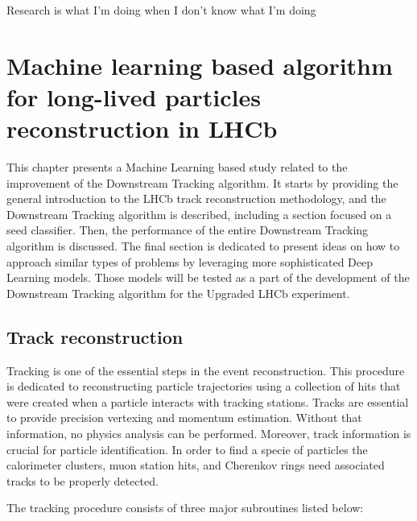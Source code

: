 \begin{savequote}[75mm] 
Research is what I’m doing when I don’t know what I’m doing
\end{savequote}

\chapter{Machine learning based algorithm for long-lived particles reconstruction in LHCb}
\label{chapter:PLLT}

This chapter presents a Machine Learning based study related to the improvement of the Downstream Tracking algorithm. It starts by providing the general introduction to the LHCb track reconstruction methodology, and the Downstream Tracking algorithm is described, including a section focused on a seed classifier. Then, the performance of the entire Downstream Tracking algorithm is discussed. The final section is dedicated to present ideas on how to approach similar types of problems by leveraging more sophisticated Deep Learning models. Those models will be tested as a part of the development of the Downstream Tracking algorithm for the Upgraded LHCb experiment.   

\section{Track reconstruction}
Tracking is one of the essential steps in the event reconstruction. This procedure is dedicated to reconstructing particle trajectories using a collection of hits that were created when a particle interacts with tracking stations. Tracks are essential to provide precision vertexing and momentum estimation. Without that information, no physics analysis can be performed. Moreover, track information is crucial for particle identification. In order to find a specie of particles the calorimeter clusters, muon station hits, and Cherenkov rings need associated tracks to be properly detected.

The tracking procedure consists of three major subroutines listed below: 

